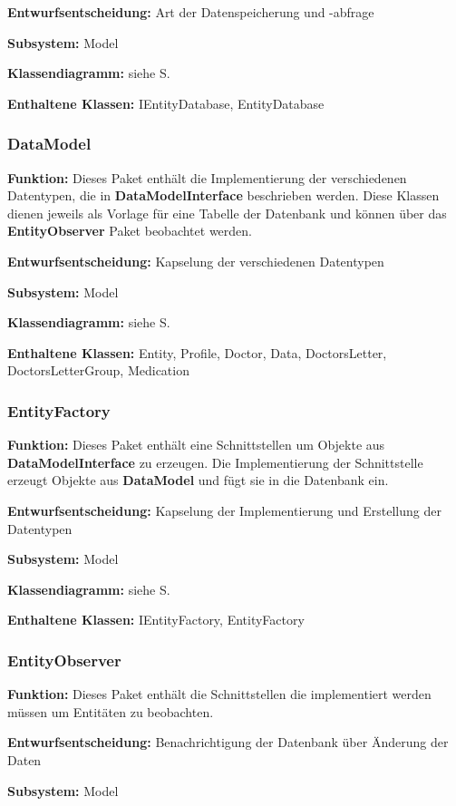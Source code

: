 \documentclass[a4paper]{scrreprt}
\begin{document}
\textbf{Entwurfsentscheidung:} Art der Datenspeicherung und -abfrage 

\textbf{Subsystem:} Model

\textbf{Klassendiagramm:} siehe S.

\textbf{Enthaltene Klassen:} IEntityDatabase, EntityDatabase

\subsubsection{DataModel}
\textbf{Funktion:} Dieses Paket enthält die Implementierung der verschiedenen Datentypen, die in \textbf{DataModelInterface} beschrieben werden. 
Diese Klassen dienen jeweils als Vorlage für eine Tabelle der Datenbank und können über das \textbf{EntityObserver} Paket beobachtet werden.

\textbf{Entwurfsentscheidung:} Kapselung der verschiedenen Datentypen

\textbf{Subsystem:} Model

\textbf{Klassendiagramm:} siehe S.

\textbf{Enthaltene Klassen:} Entity, Profile, Doctor, Data, DoctorsLetter, DoctorsLetterGroup, Medication

\subsubsection{EntityFactory}
\textbf{Funktion:} Dieses Paket enthält eine Schnittstellen um Objekte aus \textbf{DataModelInterface} zu erzeugen.
Die Implementierung der Schnittstelle erzeugt Objekte aus \textbf{DataModel} und fügt sie in die Datenbank ein.

\textbf{Entwurfsentscheidung:} Kapselung der Implementierung und Erstellung der Datentypen

\textbf{Subsystem:} Model

\textbf{Klassendiagramm:} siehe S.

\textbf{Enthaltene Klassen:} IEntityFactory, EntityFactory

\subsubsection{EntityObserver}
\textbf{Funktion:} Dieses Paket enthält die Schnittstellen die implementiert werden müssen um Entitäten zu beobachten.

\textbf{Entwurfsentscheidung:} Benachrichtigung der Datenbank über Änderung der Daten

\textbf{Subsystem:} Model
\end{document}
